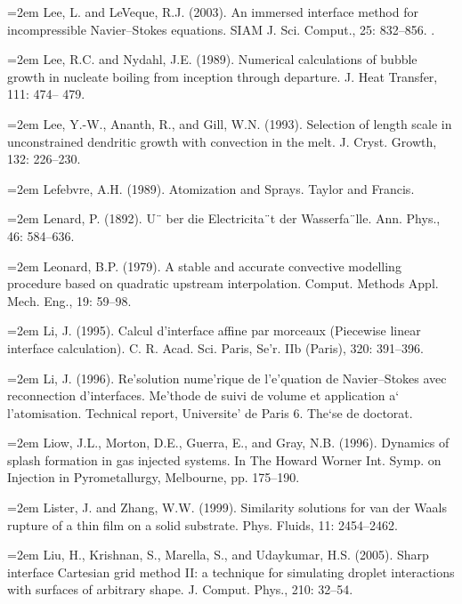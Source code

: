 \documentclass[11pt,a4paper,openany,fontset=none]{ctexbook}
\begin{document}
\par\hangindent=2em Lee, L. and LeVeque, R.J. (2003). An immersed interface method for incompressible Navier--Stokes equations. SIAM J. Sci. Comput., 25: 832--856. .

\par\hangindent=2em Lee, R.C. and Nydahl, J.E. (1989). Numerical calculations of bubble growth in nucleate boiling from inception through departure. J. Heat Transfer, 111: 474-- 479.

\par\hangindent=2em Lee, Y.-W., Ananth, R., and Gill, W.N. (1993). Selection of length scale in unconstrained dendritic growth with convection in the melt. J. Cryst. Growth, 132: 226--230.

\par\hangindent=2em Lefebvre, A.H. (1989). Atomization and Sprays. Taylor and Francis.

\par\hangindent=2em Lenard, P. (1892). U¨ ber die Electricita¨t der Wasserfa¨lle. Ann. Phys., 46: 584--636.

\par\hangindent=2em Leonard, B.P. (1979). A stable and accurate convective modelling procedure based on quadratic upstream interpolation. Comput. Methods Appl. Mech. Eng., 19: 59--98.

\par\hangindent=2em Li, J. (1995). Calcul d’interface affine par morceaux (Piecewise linear interface calculation). C. R. Acad. Sci. Paris, Se'r. IIb (Paris), 320: 391--396.

\par\hangindent=2em Li, J. (1996). Re'solution nume'rique de l’e'quation de Navier--Stokes avec reconnection d’interfaces. Me'thode de suivi de volume et application a` l’atomisation. Technical report, Universite' de Paris 6. The`se de doctorat.

\par\hangindent=2em Liow, J.L., Morton, D.E., Guerra, E., and Gray, N.B. (1996). Dynamics of splash formation in gas injected systems. In The Howard Worner Int. Symp. on Injection in Pyrometallurgy, Melbourne, pp. 175--190.

\par\hangindent=2em Lister, J. and Zhang, W.W. (1999). Similarity solutions for van der Waals rupture of a thin film on a solid substrate. Phys. Fluids, 11: 2454--2462.

\par\hangindent=2em Liu, H., Krishnan, S., Marella, S., and Udaykumar, H.S. (2005). Sharp interface Cartesian grid method II: a technique for simulating droplet interactions with surfaces of arbitrary shape. J. Comput. Phys., 210: 32--54.
\end{document}
